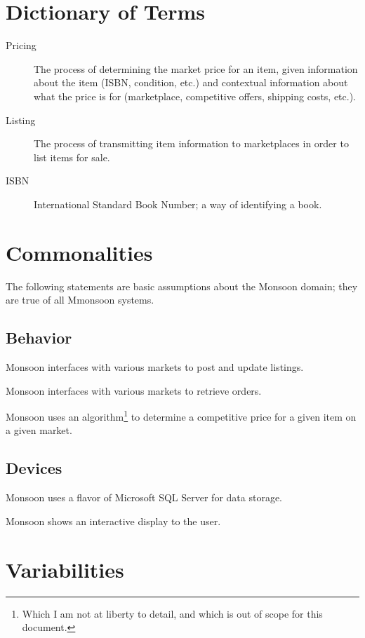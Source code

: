 \documentclass[letterpaper,11pt]{article}
\newcounter{type}
\newcounter{item}[type]
\newcommand{\com}[1]{\stepcounter{item}\item[\Alph{type}\arabic{item}.]{#1}}
\begin{document}
\section{Dictionary of Terms}

\begin{description}
\item[Pricing] The process of determining the market price for an item, given information about the item (ISBN, condition, etc.) and contextual information about what the price is for (marketplace, competitive offers, shipping costs, etc.).
\item[Listing] The process of transmitting item information to marketplaces in order to list items for sale.
\item[ISBN] International Standard Book Number; a way of identifying a book.
\end{description}

\section{Commonalities}
\setcounter{type}{3} %

The following statements are basic assumptions about the Monsoon domain; they are true of all Mmonsoon systems.

\subsection{Behavior}

\begin{description}
  \com{Monsoon interfaces with various markets to post and update listings.}
  \com{Monsoon interfaces with various markets to retrieve orders.}
  \com{Monsoon uses an algorithm\footnote{Which I am not at liberty to detail, and which is out of scope for this document.} to determine a competitive price for a given item on a given market.}
\end{description}

\subsection{Devices}

\begin{description}
  \com{Monsoon uses a flavor of Microsoft SQL Server for data storage.}
  \com{Monsoon shows an interactive display to the user.}
\end{description}


\section{Variabilities}
\setcounter{type}{22} %
\setcounter{item}{0}
\end{document}
